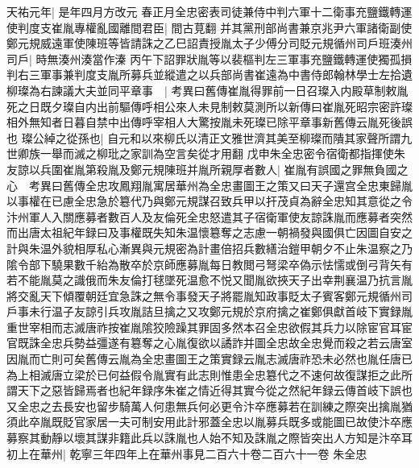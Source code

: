 天祐元年|{
	是年四月方改元}
春正月全忠密表司徒兼侍中判六軍十二衛事充鹽鐵轉運使判度支崔胤專權亂國離間君臣|{
	間古莧翻}
并其黨刑部尚書兼京兆尹六軍諸衛副使鄭元規威遠軍使陳班等皆請誅之乙巳詔責授胤太子少傅分司貶元規循州司戶班湊州司戶|{
	時無湊州湊當作溱}
丙午下詔罪狀胤等以裴樞判左三軍事充鹽鐵轉運使獨孤損判右三軍事兼判度支胤所募兵並縱遣之以兵部尚書崔遠為中書侍郎翰林學士左拾遺柳璨為右諫議大夫並同平章事　|{
	考異曰舊傳崔胤得罪前一日召璨入内殿草制敕胤死之日既夕璨自内出前驅傳呼相公來人未見制敕莫測所以新傳曰崔胤死昭宗密許璨相外無知者日暮自禁中出傳呼宰相人大驚按胤未死璨已除平章事新舊傳云胤死後誤也}
璨公綽之從孫也|{
	自元和以來柳氏以清正文雅世濟其美至柳璨而隤其家聲所謂九世卿族一舉而滅之柳玭之家訓為空言矣從才用翻}
戊申朱全忠密令宿衛都指揮使朱友諒以兵圍崔胤第殺胤及鄭元規陳班并胤所親厚者數人|{
	崔胤有誤國之罪無負國之心　考異曰舊傳全忠攻鳳翔胤寓居華州為全忠畫圖王之策又曰天子還宫全忠東歸胤以事權在已慮全忠急於簒代乃與鄭元規謀召致兵甲以扞茂貞為辭全忠知其意從之令汴州軍人入關應募者數百人及友倫死全忠怒遣其子宿衛軍使友諒誅胤而應募者突然而出唐太祖紀年録曰及事權既失知朱温懷簒奪之志慮一朝禍發與國俱亡因圖自安之計與朱温外貌相厚私心漸異與元規密為計畫倍招兵數繕治鎧甲朝夕不止朱温察之乃隂令部下驍果數千紿為散卒於京師應募胤每日教閲弓弩梁卒偽示怯懦或倒弓背矢有若不能胤莫之識俄而朱友倫打毬墜死温愈不悦又聞胤欲挾天子出幸荆襄温乃抗言胤將交亂天下傾覆朝廷宜急誅之無令事發天子將罷胤知政事貶太子賓客鄭元規循州司戶事未行温子友諒引兵攻胤詰旦擒之又攻鄭元規於京府擒之崔鄭俱獻首岐下實録胤重世宰相而志滅唐祚按崔胤隂狡險躁其罪固多然本召全忠欲假其兵力以除宦官耳宦官既誅全忠兵勢益彊遂有簒奪之心胤復欲以譎詐并圖全忠故全忠覺而殺之若云唐室因胤而亡則可矣舊傳云胤為全忠畫圖王之策實録云胤志滅唐祚恐未必然也胤任唐已為上相滅唐立梁於已何益假令胤實有此志則惟患全忠簒代之不速何故復謀拒之此所謂天下之惡皆歸焉者也紀年録序朱崔之情近得其實今從之然紀年録云傳首岐下誤也又全忠之去長安也留步騎萬人何患無兵何必更令汴卒應募若在訓練之際突出擒胤猶須此卒胤既貶官家居一夫可制安用此計邪蓋全忠以胤募兵既多或能圖已故使汴卒應募察其動靜以壞其謀非籍此兵以誅胤也人始不知及誅胤之際皆突出人方知是汴卒耳}
初上在華州|{
	乾寧三年四年上在華州事見二百六十卷二百六十一卷}
朱全忠

